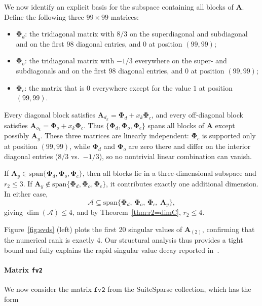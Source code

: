 \documentclass{siamart251216}
\newcommand{\munfold}[2]{\mathbf{#1}_{(#2)}}
\def\bA{\mathbf{A}}
\def\bPhi{\mathbf{\Phi}}
\begin{document}
We now identify an explicit basis for the subspace containing all blocks of $\bA$.  Define the
following three $99\times 99$ matrices:
\begin{itemize}
    \item $\bPhi_d$: the tridiagonal matrix with $8/3$ on the superdiagonal and subdiagonal and
          on the first 98 diagonal entries, and $0$ at position $(99,99)$;
    \item $\bPhi_o$: the tridiagonal matrix with $-1/3$ everywhere on the super- and
          subdiagonals and on the first 98 diagonal entries, and $0$ at position $(99,99)$;
    \item $\bPhi_c$: the matrix that is $0$ everywhere except for the value $1$ at position
          $(99,99)$.
\end{itemize}
Every diagonal block satisfies $\bA_{d_k} = \bPhi_d + x_k\bPhi_c$, and every off-diagonal block
satisfies $\bA_{o_k} = \bPhi_o + x_k\bPhi_c$.  Thus $\{\bPhi_d, \bPhi_o, \bPhi_c\}$ spans all
blocks of $\bA$ except possibly $\bA_y$.  These three matrices are linearly independent: $\bPhi_c$ is supported only
at position $(99,99)$, while $\bPhi_d$ and $\bPhi_o$ are zero there and differ on the interior
diagonal entries ($8/3$ vs.\ $-1/3$), so no nontrivial linear combination can vanish.

If $\bA_y \in \mathrm{span}\{\bPhi_d,\bPhi_o,\bPhi_c\}$, then all blocks lie in a
three-dimensional subspace and $r_2 \le 3$.  If $\bA_y \notin
\mathrm{span}\{\bPhi_d,\bPhi_o,\bPhi_c\}$, it contributes exactly one additional dimension.
In either case,
\begin{equation*}
    \mathscr{A} \subseteq \mathrm{span}\{\bPhi_d,\,\bPhi_o,\,\bPhi_c,\,\bA_y\},
\end{equation*}
giving $\dim(\mathscr{A})\le 4$, and by Theorem~\ref{thm:r2=dimC}, $r_2\le 4$.

Figure~\ref{fig:svds} (left) plots the first 20 singular values of $\munfold{A}{2}$, confirming that the numerical rank is exactly 4.  Our structural analysis thus provides a tight bound and fully explains the rapid singular value decay reported in~\cite{kilmer2022matrixtensordecomp}.

\paragraph{Matrix \texttt{fv2}}
We now consider the matrix $\mathtt{fv2}$ from the SuiteSparse collection, which has the form
\end{document}
